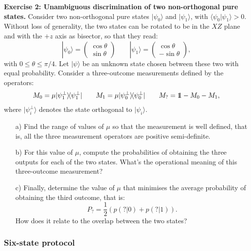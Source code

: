 \documentclass[a4paper]{article}
\def\one{\leavevmode\hbox{\small1\normalsize\kern-.33em1}}
\def\bra#1{\langle#1|} \def\ket#1{|#1\rangle}
\def\proj#1{\ket{#1}\!\bra{#1}}
\begin{document}
\textbf{Exercise 2: Unambiguous discrimination of two non-orthogonal pure states.} Consider two non-orthogonal pure states $\ket{\psi_0}$ and $\ket{\psi_1}$, with $\langle \psi_0\ket{\psi_1}>0$. Without loss of generality, the two states can be rotated to be in the $XZ$ plane and with the $+z$ axis as bisector, so that they read:
\begin{equation}
\label{states}
\ket{\psi_0}=\left(\begin{array}{c}\cos\theta \\ \sin\theta\end{array}\right) \quad\quad
\ket{\psi_1}=\left(\begin{array}{c}\cos\theta \\ -\sin\theta\end{array}\right) ,
\end{equation}
with $0\leq\theta\leq\pi/4$. Let $\ket{\psi}$ be an unknown state chosen between these two with equal probability. Consider a three-outcome measurements defined by the operators:
\begin{equation}
\label{povm}
M_0=\mu\proj{\psi_1^\perp} \quad\quad  M_1=\mu\proj{\psi_0^\perp}   \quad\quad  M_?=\one-M_0-M_1 ,
\end{equation}
where $\ket{\psi_i^\perp}$ denotes the state orthogonal to $\ket{\psi_i}$. 
\begin{itemize}
\item[a)] Find the range of values of $\mu$ so that the measurement is well defined, that is, all the three measurement operators are positive semi-definite. 
\item[b)] For this value of $\mu$, compute the probabilities of obtaining the three outputs for each of the two states. What's the operational meaning of this three-outcome measurement? 
\item[c)] Finally, determine the value of $\mu$ that minimises the average probability of obtaining the third outcome, that is:
\begin{equation}
P_?=\frac{1}{2}\left(p(?|0)+p(?|1)\right) .
\end{equation}
How does it relate to the overlap between the two states?
\end{itemize}


\subsubsection{Six-state protocol}
\end{document}
